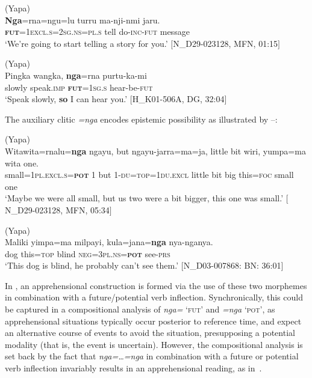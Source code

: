 \documentclass[output=paper,colorlinks,citecolor=brown]{langscibook}
\begin{document}
\ea 
\textnormal{ (Yapa)} \\
\gll \textbf{Nga}=rna=ngu=lu turru ma-nji-nmi jaru. \\
\textsc{\textbf{fut}=1excl.s=2sg.ns=pl.s} tell do-\textsc{inc-fut} message \\
\glt `We’re going to start telling a story for you.' $[$N\_D29-023128, MFN, 01:15$]$
\label{ex:bro52}
\z

\ea 
\textnormal{ (Yapa)} \\
\gll Pingka wangka, \textbf{nga}=rna purtu-ka-mi \\
slowly speak.\textsc{imp} \textsc{\textbf{fut}=1sg.s} hear-be-\textsc{fut} \\
\glt `Speak slowly, \textbf{so} I can hear you.' $[$H\_K01-506A, DG, 32:04$]$
\label{ex:bro53}
\z

The auxiliary clitic \textit{=nga} encodes epistemic possibility as illustrated by --:

\ea 
\textnormal{ (Yapa)} \\
\gll Witawita=rnalu=\textbf{nga} ngayu, but ngayu-jarra=ma=ja, little bit wiri, yumpa=ma wita one. \\
small=\textsc{1pl.excl.s=\textbf{pot}} 1 but 1-\textsc{du=top=1du.excl} little bit big this=\textsc{foc} small one \\
\glt `Maybe we were all small, but us two were a bit bigger, this one was small.' $[$N\_D29-023128, MFN, 05:34$]$
\label{ex:bro54}
\z

\ea 
\textnormal{ (Yapa)} \\
\gll Maliki yimpa=ma milpayi, kula=jana=\textbf{nga} nya-nganya. \\
dog this=\textsc{top} blind \textsc{neg=3pl.ns=\textbf{pot}} see-\textsc{prs} \\
\glt `This dog is blind, he probably can't see them.' $[$N\_D03-007868: BN: 36:01$]$
\label{ex:bro55}
\z


 In , an apprehensional construction is formed via the use of these two morphemes in combination with a future/potential verb inflection. Synchronically, this could be captured in a compositional analysis of \textit{nga=} \textsc{`fut'} and \textit{=nga} \textsc{`pot'}, as apprehensional situations typically occur posterior to reference time, and expect an alternative course of events to avoid the situation, presupposing a potential modality (that is, the event is uncertain). However, the compositional analysis is set back by the fact that \textit{nga=\ldots=nga} in combination with a future or potential verb inflection invariably results in an apprehensional reading, as in~.
\end{document}
